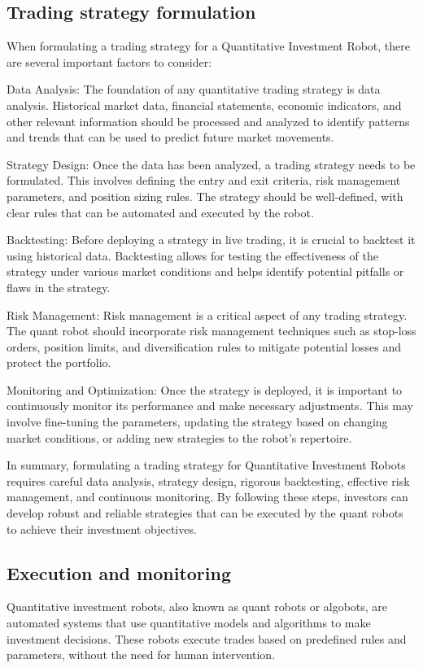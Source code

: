 \documentclass[UTF8]{ctexart}
\begin{document}
\subsection{Trading strategy formulation}
When formulating a trading strategy for a Quantitative Investment Robot, there are several important factors to consider:

Data Analysis: The foundation of any quantitative trading strategy is data analysis. Historical market data, financial statements, economic indicators, and other relevant information should be processed and analyzed to identify patterns and trends that can be used to predict future market movements.

Strategy Design: Once the data has been analyzed, a trading strategy needs to be formulated. This involves defining the entry and exit criteria, risk management parameters, and position sizing rules. The strategy should be well-defined, with clear rules that can be automated and executed by the robot.

Backtesting: Before deploying a strategy in live trading, it is crucial to backtest it using historical data. Backtesting allows for testing the effectiveness of the strategy under various market conditions and helps identify potential pitfalls or flaws in the strategy.

Risk Management: Risk management is a critical aspect of any trading strategy. The quant robot should incorporate risk management techniques such as stop-loss orders, position limits, and diversification rules to mitigate potential losses and protect the portfolio.

Monitoring and Optimization: Once the strategy is deployed, it is important to continuously monitor its performance and make necessary adjustments. This may involve fine-tuning the parameters, updating the strategy based on changing market conditions, or adding new strategies to the robot's repertoire.

In summary, formulating a trading strategy for Quantitative Investment Robots requires careful data analysis, strategy design, rigorous backtesting, effective risk management, and continuous monitoring. By following these steps, investors can develop robust and reliable strategies that can be executed by the quant robots to achieve their investment objectives.
\subsection{Execution and monitoring}
Quantitative investment robots, also known as quant robots or algobots, are automated systems that use quantitative models and algorithms to make investment decisions. These robots execute trades based on predefined rules and parameters, without the need for human intervention.
\end{document}
